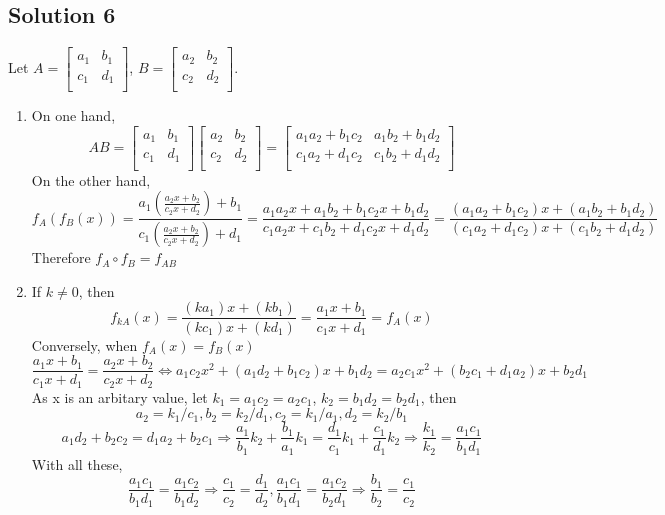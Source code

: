 \documentclass{article}
\begin{document}
\subsection*{Solution 6}
Let $A = \left[\begin{array}{cc} a_1 & b_1 \\ c_1 &  d_1 \\ \end{array}\right]$,
 $B = \left[\begin{array}{cc} a_2 & b_2 \\ c_2 &  d_2 \\ \end{array}\right]$.
\begin{enumerate}
    \item 
     On one hand,
     \[AB = \left[\begin{array}{cc} a_1 & b_1 \\ c_1 &  d_1 \\ \end{array}\right] \left[\begin{array}{cc} a_2 & b_2 \\ c_2 &  d_2 \\ \end{array}\right] = \left[\begin{array}{cc} a_1a_2 + b_1c_2 & a_1b_2+b_1d_2 \\ c_1a_2 + d_1c_2 &  c_1b_2+d_1d_2 \\ \end{array}\right]\]
     On the other hand,
     \[f_A(f_B(x)) = \frac{a_1(\frac{a_2x+b_2}{c_2x+d_2})+b_1}{c_1 (\frac{a_2x+b_2}{c_2x+d_2})+d_1} = \frac{a_1a_2x+a_1b_2+b_1c_2x+b_1d_2}{c_1a_2x+c_1b_2+d_1c_2x+d_1d_2} = \frac{(a_1a_2+b_1c_2)x+(a_1b_2+b_1d_2)}{(c_1a_2+d_1c_2)x+ (c_1b_2+d_1d_2)}\]
     Therefore $f_A \circ f_B = f_{AB}$
     \item
      If $k\neq 0$, then 
     \[f_{kA}(x) = \frac{(ka_1)x + (kb_1)}{(kc_1)x +(kd_1)} = \frac{a_1x+b_1}{c_1x+d_1}=f_A(x)\]
     Conversely, when $f_A(x)=f_B(x)$
     \[\frac{a_1x+b_1}{c_1x+d_1}=\frac{a_2x+b_2}{c_2x+d_2}\Leftrightarrow a_1c_2x^2+(a_1d_2+b_1c_2)x+b_1d_2=a_2c_1x^2+(b_2c_1+d_1a_2)x+b_2d_1\]
     As x is an arbitary value, let $k_1=a_1c_2=a_2c_1$, $k_2=b_1d_2=b_2d_1$, then 
     \[a_2=k_1/c_1, b_2=k_2/d_1, c_2 = k_1/a_1, d_2 = k_2/b_1\]
     \[a_1d_2+b_2c_2=d_1a_2+b_2c_1 \Rightarrow \frac{a_1}{b_1}k_2 + \frac{b_1}{a_1}k_1= \frac{d_1}{c_1}k_1+\frac{c_1}{d_1}k_2\Rightarrow\frac{k_1}{k_2}=\frac{a_1c_1}{b_1d_1}\]
     With all these, 
     \[\frac{a_1c_1}{b_1d_1}=\frac{a_1c_2}{b_1d_2}\Rightarrow \frac{c_1}{c_2}=\frac{d_1}{d_2}, \frac{a_1c_1}{b_1d_1}= \frac{a_1c_2}{b_2d_1}\Rightarrow \frac{b_1}{b_2}=\frac{c_1}{c_2}
\]
\end{enumerate}
\end{document}
